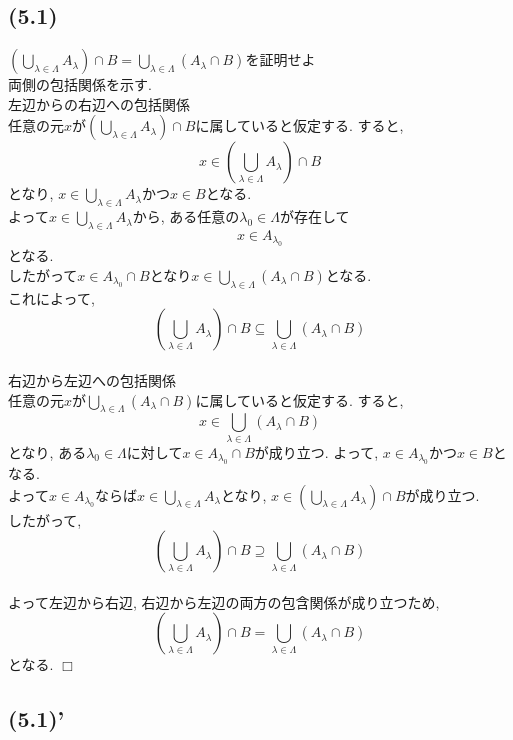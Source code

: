 \documentclass[a4j]{jsarticle}
\def \QED{\hfill $\Box$}%
\begin{document}
\subsection{(5.1)}

$\left( \bigcup_{\lambda \in \Lambda}A_\lambda \right) \cap B = \bigcup_{\lambda \in \Lambda}(A_\lambda \cap B)$を証明せよ\\

両側の包括関係を示す. \\

左辺からの右辺への包括関係\\
任意の元$x$が$\left( \bigcup_{\lambda \in \Lambda}A_\lambda \right) \cap B$に属していると仮定する. すると, $$x \in \left( \bigcup_{\lambda \in \Lambda}A_\lambda \right) \cap B$$となり, $x \in \bigcup_{\lambda \in \Lambda}A_\lambda$かつ$x \in B$となる. \\
よって$x \in \bigcup_{\lambda \in \Lambda}A_\lambda$から, ある任意の$\lambda_0 \in \Lambda$が存在して$$ x \in A_{\lambda_0} $$となる. \\
したがって$x \in A_{\lambda_0} \cap B$となり$x \in \bigcup_{\lambda \in \Lambda}(A_\lambda \cap B)$となる. \\
これによって, $$\left( \bigcup_{\lambda \in \Lambda}A_\lambda \right) \cap B \subseteq \bigcup_{\lambda \in \Lambda}(A_\lambda \cap B)$$\\

右辺から左辺への包括関係\\
任意の元$x$が$\bigcup_{\lambda \in \Lambda}(A_\lambda \cap B)$に属していると仮定する. すると, $$x \in \bigcup_{\lambda \in \Lambda}(A_\lambda \cap B)$$となり, ある$\lambda_0 \in \Lambda$に対して$x \in A_{\lambda_0} \cap B$が成り立つ. よって, $x \in A_{\lambda_0}$かつ$x \in B$となる. \\
よって$x \in A_{\lambda_0}$ならば$x \in \bigcup_{\lambda \in \Lambda}A_\lambda$となり, $x \in \left( \bigcup_{\lambda \in \Lambda}A_\lambda \right) \cap B$が成り立つ. \\
したがって, $$\left( \bigcup_{\lambda \in \Lambda}A_\lambda \right) \cap B \supseteq \bigcup_{\lambda \in \Lambda}(A_\lambda \cap B)$$\\
よって左辺から右辺, 右辺から左辺の両方の包含関係が成り立つため, $$\left( \bigcup_{\lambda \in \Lambda}A_\lambda \right) \cap B = \bigcup_{\lambda \in \Lambda}(A_\lambda \cap B)$$となる. \QED

\subsection{(5.1)'}
\end{document}
